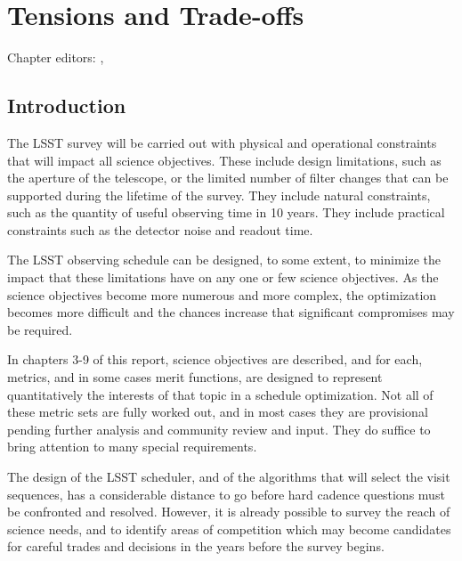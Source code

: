 \chapter[Tensions and Trade-offs]{Tensions and Trade-offs}
\def\chpname{tradeoffs}\label{chp:\chpname}

Chapter editors:
,


\section{Introduction}

The LSST survey will be carried out with physical and operational
constraints that will impact all science objectives.  These include
design limitations, such as the aperture of the telescope, or the
limited number of filter changes that can be supported during the
lifetime of the survey.  They include natural constraints, such as the
quantity of useful observing time in 10 years. They include practical
constraints such as the detector noise and readout time.

The LSST observing schedule can be designed, to some extent, to minimize
the impact that these limitations have on any one or few science
objectives. As the science objectives become more numerous and more
complex, the optimization becomes more difficult and the chances
increase that significant compromises may be required.

In chapters 3-9 of this report, science objectives are described, and
for each, metrics, and in some cases merit functions, are designed to
represent quantitatively the interests of that topic in a schedule
optimization.  Not all of these metric sets are fully worked out, and in
most cases they are provisional pending further analysis and community
review and input.  They do suffice to bring attention to many special
requirements.

The design of the LSST scheduler, and of the algorithms that will select
the visit sequences, has a considerable distance to go before hard
cadence questions must be confronted and resolved.  However, it is
already possible to survey the reach of science needs, and to identify
areas of competition which may become candidates for careful trades and
decisions in the years before the survey begins.

